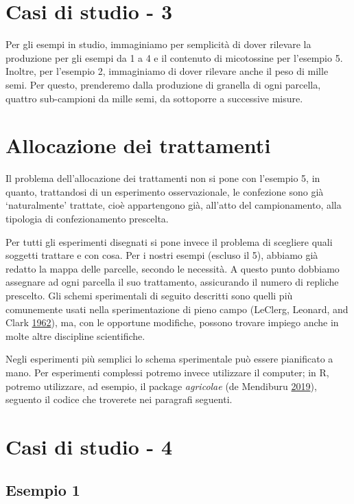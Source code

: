 \documentclass[a4paper,12pt,oneside]{book}
\theoremstyle{definition}
\theoremstyle{definition}
\theoremstyle{definition}
\theoremstyle{remark}
\begin{document}
\section{Casi di studio - 3}\label{casi-di-studio---3}

Per gli esempi in studio, immaginiamo per semplicità di dover rilevare
la produzione per gli esempi da 1 a 4 e il contenuto di micotossine per
l'esempio 5. Inoltre, per l'esempio 2, immaginiamo di dover rilevare
anche il peso di mille semi. Per questo, prenderemo dalla produzione di
granella di ogni parcella, quattro sub-campioni da mille semi, da
sottoporre a successive misure.

\section{Allocazione dei trattamenti}\label{allocazione-dei-trattamenti}

Il problema dell'allocazione dei trattamenti non si pone con l'esempio
5, in quanto, trattandosi di un esperimento osservazionale, le
confezione sono già `naturalmente' trattate, cioè appartengono già,
all'atto del campionamento, alla tipologia di confezionamento prescelta.

Per tutti gli esperimenti disegnati si pone invece il problema di
scegliere quali soggetti trattare e con cosa. Per i nostri esempi
(escluso il 5), abbiamo già redatto la mappa delle parcelle, secondo le
necessità. A questo punto dobbiamo assegnare ad ogni parcella il suo
trattamento, assicurando il numero di repliche prescelto. Gli schemi
sperimentali di seguito descritti sono quelli più comunemente usati
nella sperimentazione di pieno campo (LeClerg, Leonard, and Clark
\protect\hyperlink{ref-leclerg1962_FieldPlotTechnique}{1962}), ma, con
le opportune modifiche, possono trovare impiego anche in molte altre
discipline scientifiche.

Negli esperimenti più semplici lo schema sperimentale può essere
pianificato a mano. Per esperimenti complessi potremo invece utilizzare
il computer; in R, potremo utilizzare, ad esempio, il package
\emph{agricolae} (de Mendiburu
\protect\hyperlink{ref-de-Mendiburu:2019aa}{2019}), seguento il codice
che troverete nei paragrafi seguenti.

\section{Casi di studio - 4}\label{casi-di-studio---4}

\subsection{Esempio 1}\label{esempio-1-1}
\end{document}
